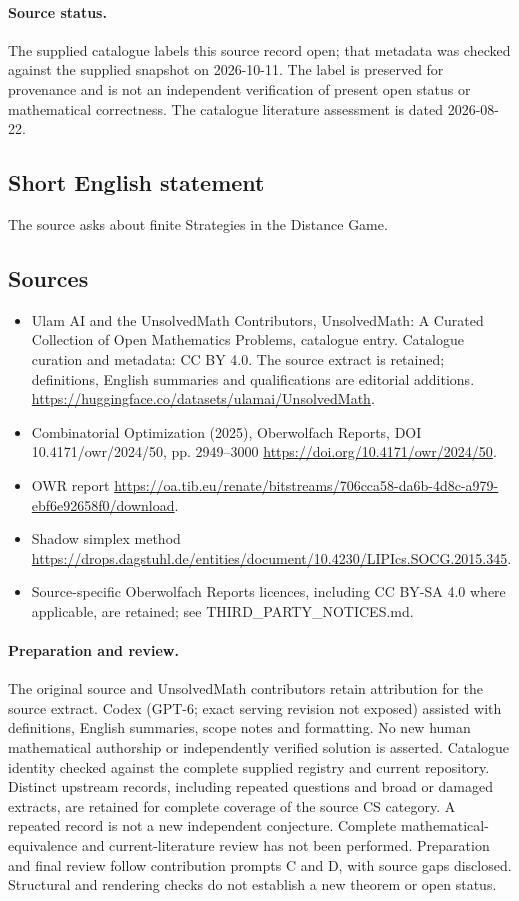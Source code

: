 \documentclass[11pt]{article}
\begin{document}
\paragraph{Source status.}
The supplied catalogue labels this source record open; that metadata was checked against the supplied snapshot on 2026-10-11. The label is preserved for provenance and is not an independent verification of present open status or mathematical correctness. The catalogue literature assessment is dated 2026-08-22.
\subsection{Short English statement}
The source asks about finite Strategies in the Distance Game.
\subsection{Sources}
\begin{itemize}
\item[S1] Ulam AI and the UnsolvedMath Contributors, UnsolvedMath: A Curated Collection of Open Mathematics Problems, catalogue entry. Catalogue curation and metadata: CC BY 4.0. The source extract is retained; definitions, English summaries and qualifications are editorial additions.
\url{https://huggingface.co/datasets/ulamai/UnsolvedMath}.
\item[S2] Combinatorial Optimization (2025), Oberwolfach Reports, DOI 10.4171/owr/2024/50, pp. 2949--3000
\url{https://doi.org/10.4171/owr/2024/50}.
\item[S3] OWR report
\url{https://oa.tib.eu/renate/bitstreams/706cca58-da6b-4d8c-a979-ebf6e92658f0/download}.
\item[S4] Shadow simplex method
\url{https://drops.dagstuhl.de/entities/document/10.4230/LIPIcs.SOCG.2015.345}.
\item Source-specific Oberwolfach Reports licences, including CC BY-SA 4.0 where applicable, are retained; see THIRD\_PARTY\_NOTICES.md.
\end{itemize}
\paragraph{Preparation and review.}
The original source and UnsolvedMath contributors retain attribution for the source extract. Codex (GPT-6; exact serving revision not exposed) assisted with definitions, English summaries, scope notes and formatting. No new human mathematical authorship or independently verified solution is asserted. Catalogue identity checked against the complete supplied registry and current repository. Distinct upstream records, including repeated questions and broad or damaged extracts, are retained for complete coverage of the source CS category. A repeated record is not a new independent conjecture. Complete mathematical-equivalence and current-literature review has not been performed. Preparation and final review follow contribution prompts C and D, with source gaps disclosed. Structural and rendering checks do not establish a new theorem or open status.
\label{end:statement}
\end{document}
